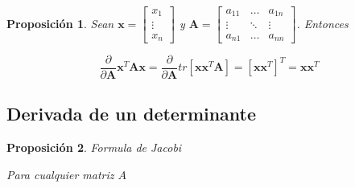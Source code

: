 \documentclass[12pt, twoside]{book}\usepackage[]{graphicx}\usepackage[]{color}
\numberwithin{equation}{section}
\numberwithin{theorem}{section}
\newtheorem{teorema}{Proposición}
\newenvironment{teo}
      {\begin{shaded}\begin{teorema}}
      {\end{teorema}\end{shaded}}
\numberwithin{teorema}{section}
\numberwithin{defi}{section}
\numberwithin{prop}{section}
\numberwithin{defi}{section}
\theoremstyle{plain}
\begin{document}
\begin{teorema}
Sean $\mathbf{x} = \left[\begin{array}{c} x_{1} \\ \vdots \\ x_{n} \end{array}\right]$ y $\mathbf{A} =
\left[\begin{array}{ccc}
a_{11} & \hdots & a_{1n} \\ 
\vdots & \ddots & \vdots \\ 
a_{n1} & \hdots & a_{nn}
\end{array}\right]$. Entonces

\begin{equation}
\frac{\partial}{\partial \mathbf{A}}\mathbf{x}^{T}\mathbf{Ax} = 
\frac{\partial}{\partial \mathbf{A}}tr\left[\mathbf{xx}^{T}\mathbf{A}\right] = \left[\mathbf{xx}^{T}\right]^{T} = \mathbf{xx}^{T}
\end{equation}

\end{teorema}
\subsection{Derivada de un determinante}

\begin{teo}{Formula de Jacobi}

Para cualquier matriz $A$

\end{teo}
\end{document}
